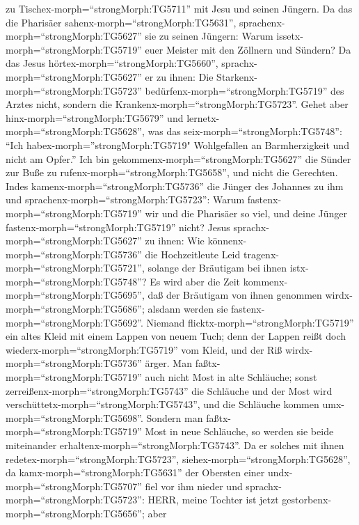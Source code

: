 zu Tischex-morph=``strongMorph:TG5711'' mit Jesu und seinen Jüngern.
 Da das die Pharisäer sahenx-morph=``strongMorph:TG5631'',
sprachenx-morph=``strongMorph:TG5627'' sie zu seinen Jüngern: Warum
issetx-morph=``strongMorph:TG5719'' euer Meister mit den Zöllnern und
Sündern?  Da das Jesus hörtex-morph=``strongMorph:TG5660'',
sprachx-morph=``strongMorph:TG5627'' er zu ihnen: Die
Starkenx-morph=``strongMorph:TG5723''
bedürfenx-morph=``strongMorph:TG5719'' des Arztes nicht, sondern die
Krankenx-morph=``strongMorph:TG5723''.  Gehet aber
hinx-morph=``strongMorph:TG5679'' und
lernetx-morph=``strongMorph:TG5628'', was das
seix-morph=``strongMorph:TG5748'': ``Ich
habex-morph=''strongMorph:TG5719" Wohlgefallen an Barmherzigkeit und
nicht am Opfer.'' Ich bin gekommenx-morph=``strongMorph:TG5627'' die
Sünder zur Buße zu rufenx-morph=``strongMorph:TG5658'', und nicht die
Gerechten.  Indes kamenx-morph=``strongMorph:TG5736'' die
Jünger des Johannes zu ihm und sprachenx-morph=``strongMorph:TG5723'':
Warum fastenx-morph=``strongMorph:TG5719'' wir und die Pharisäer so
viel, und deine Jünger fastenx-morph=``strongMorph:TG5719'' nicht?
 Jesus sprachx-morph=``strongMorph:TG5627'' zu ihnen: Wie
könnenx-morph=``strongMorph:TG5736'' die Hochzeitleute Leid
tragenx-morph=``strongMorph:TG5721'', solange der Bräutigam bei ihnen
istx-morph=``strongMorph:TG5748''? Es wird aber die Zeit
kommenx-morph=``strongMorph:TG5695'', daß der Bräutigam von ihnen
genommen wirdx-morph=``strongMorph:TG5686''; alsdann werden sie
fastenx-morph=``strongMorph:TG5692''.  Niemand
flicktx-morph=``strongMorph:TG5719'' ein altes Kleid mit einem Lappen
von neuem Tuch; denn der Lappen reißt doch
wiederx-morph=``strongMorph:TG5719'' vom Kleid, und der Riß
wirdx-morph=``strongMorph:TG5736'' ärger.  Man
faßtx-morph=``strongMorph:TG5719'' auch nicht Most in alte Schläuche;
sonst zerreißenx-morph=``strongMorph:TG5743'' die Schläuche und der Most
wird verschüttetx-morph=``strongMorph:TG5743'', und die Schläuche kommen
umx-morph=``strongMorph:TG5698''. Sondern man
faßtx-morph=``strongMorph:TG5719'' Most in neue Schläuche, so werden sie
beide miteinander erhaltenx-morph=``strongMorph:TG5743''. 
Da er solches mit ihnen redetex-morph=``strongMorph:TG5723'',
siehex-morph=``strongMorph:TG5628'', da
kamx-morph=``strongMorph:TG5631'' der Obersten einer
undx-morph=``strongMorph:TG5707'' fiel vor ihm nieder und
sprachx-morph=``strongMorph:TG5723'': HERR, meine Tochter ist jetzt
gestorbenx-morph=``strongMorph:TG5656''; aber
